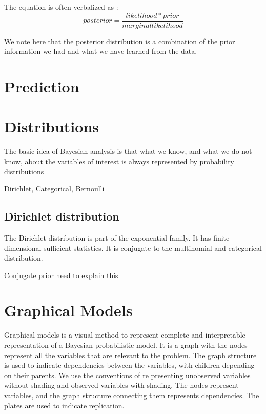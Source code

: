 The equation is often verbalized as :
\begin{equation}
	posterior = \frac{likelihood * prior}{marginal likelihood}
\end{equation}

We note here that the posterior distribution is a combination of the prior information we had and what we have learned from the data. 




\section{Prediction}

\section{Distributions }

The basic idea of Bayesian analysis is that what we know, and
what we do not know, about the variables of interest is always
represented by
probability distributions

Dirichlet, Categorical, Bernoulli 
\subsection*{Dirichlet distribution}
The Dirichlet distribution is part of the exponential family. It has finite dimensional sufficient statistics. It is conjugate to the multinomial and categorical distribution. 

Conjugate prior  need to explain this 

\section{Graphical Models}
Graphical models is a visual method to represent complete and interpretable representation of a Bayesian probabilistic model. It is a graph with the nodes represent all the variables that are relevant to the problem. The
graph structure is used to indicate dependencies between the variables, with children depending on their parents. We use the conventions of re
presenting unobserved variables without shading and observed variables with shading.
The nodes represent variables, and the
graph structure connecting them represents dependencies.
The plates are used to indicate replication.


